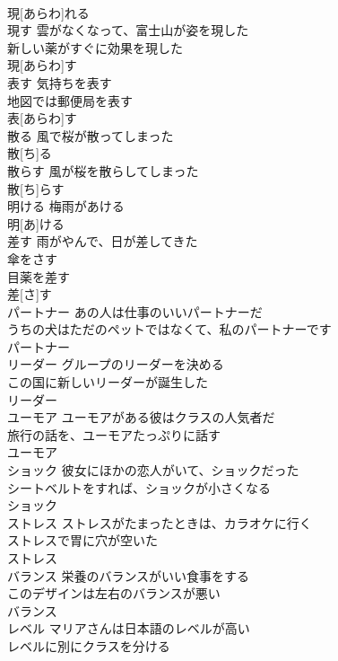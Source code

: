 \documentclass[8pt]{extreport}
\begin{document}
\begin{CJK}{UTF8}{min}
\\	現[あらわ]れる						
\\	現す	雲がなくなって、富士山が姿を現した 
\\	新しい薬がすぐに効果を現した 
\\	現[あらわ]す			
\\	表す	気持ちを表す 
\\	地図では郵便局を表す 
\\	表[あらわ]す		
\\	散る	風で桜が散ってしまった 
\\	散[ち]る						
\\	散らす	風が桜を散らしてしまった 
\\	散[ち]らす						
\\	明ける	梅雨があける 
\\	明[あ]ける						
\\	差す	雨がやんで、日が差してきた 
\\	傘をさす 
\\	目薬を差す 
\\	差[さ]す						
\\	パートナー	あの人は仕事のいいパートナーだ 
\\	うちの犬はただのペットではなくて、私のパートナーです 
\\	パートナー			
\\	リーダー	グループのリーダーを決める 
\\	この国に新しいリーダーが誕生した 
\\	リーダー			
\\	ユーモア	ユーモアがある彼はクラスの人気者だ 
\\	旅行の話を、ユーモアたっぷりに話す 
\\	ユーモア			
\\	ショック	彼女にほかの恋人がいて、ショックだった 
\\	シートベルトをすれば、ショックが小さくなる 
\\	ショック						
\\	ストレス	ストレスがたまったときは、カラオケに行く 
\\	ストレスで胃に穴が空いた 
\\	ストレス						
\\	バランス	栄養のバランスがいい食事をする 
\\	このデザインは左右のバランスが悪い 
\\	バランス						
\\	レベル	マリアさんは日本語のレベルが高い 
\\	レベルに別にクラスを分ける 

\end{CJK}
\end{document}
